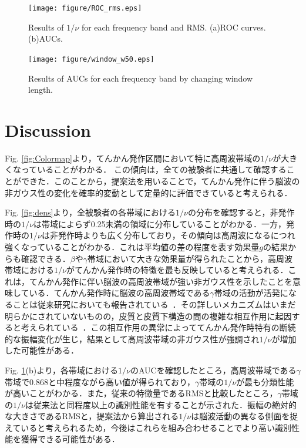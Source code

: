 \documentclass[journal]{IEEEtran}
\begin{document}
\begin{figure}[!t]
\centering
\texttt{[image: figure/ROC\_rms.eps]}
\caption{Results of $1/\nu$ for each frequency band and RMS. (a)ROC curves. (b)AUCs. }
\label{fig:roc}
\end{figure}

\begin{figure}[!t]
\centering
\texttt{[image: figure/window\_w50.eps]}
\caption{Results of AUCs for each frequency band by changing window length. }
\label{fig:window}
\end{figure}

\section{Discussion}
Fig. \ref{fig:Colormap}より，てんかん発作区間において特に高周波帯域の$1/\nu$が大きくなっていることがわかる．
この傾向は，全ての被験者に共通して確認することができた．このことから，提案法を用いることで，てんかん発作に伴う脳波の非ガウス性の変化を確率的変動として定量的に評価できていると考えられる．

Fig. \ref{fig:dens}より，全被験者の各帯域における$1/\nu$の分布を確認すると，非発作時の$1/\nu$は帯域によらず0.25未満の領域に分布していることがわかる．一方，発作時の$1/\nu$は非発作時よりも広く分布しており，その傾向は高周波になるにつれ強くなっていることがわかる．これは平均値の差の程度を表す効果量$g$の結果からも確認できる．$\beta$や$\gamma$帯域において大きな効果量が得られたことから，高周波帯域における$1/\nu$がてんかん発作時の特徴を最も反映していると考えられる．これは，てんかん発作に伴い脳波の高周波帯域が強い非ガウス性を示したことを意味している．てんかん発作時に脳波の高周波帯域である$\gamma$帯域の活動が活発になることは従来研究においても報告されている~\cite{Kobayashi2004,Kobayashi2009,Benedek2016}．その詳しいメカニズムはいまだ明らかにされていないものの，皮質と皮質下構造の間の複雑な相互作用に起因すると考えられている~\cite{Kobayashi2004}．この相互作用の異常によっててんかん発作時特有の断続的な振幅変化が生じ，結果として高周波帯域の非ガウス性が強調され$1/\nu$が増加した可能性がある．

Fig. \ref{fig:roc}(b)より，各帯域における$1/\nu$のAUCを確認したところ，高周波帯域である$\gamma$帯域で0.868と中程度ながら高い値が得られており，$\gamma$帯域の$1/\nu$が最も分類性能が高いことがわかる．また，従来の特徴量であるRMSと比較したところ，$\gamma$帯域の$1/\nu$は従来法と同程度以上の識別性能を有することが示された．振幅の絶対的な大きさであるRMSと，提案法から算出される$1/\nu$は脳波活動の異なる側面を捉えていると考えられるため，今後はこれらを組み合わせることでより高い識別性能を獲得できる可能性がある．
\end{document}
